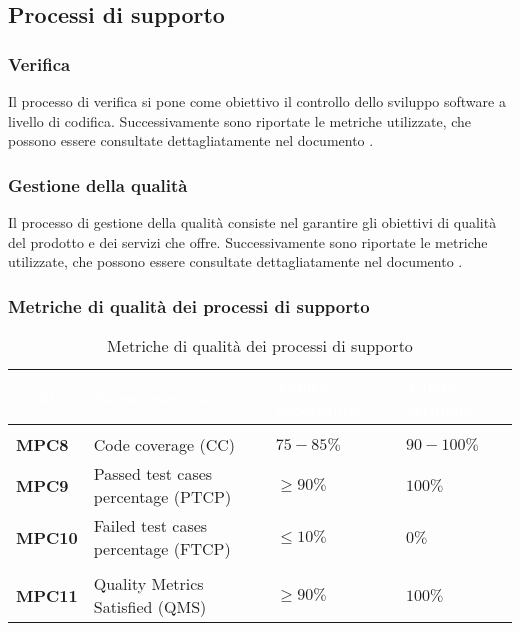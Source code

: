 \subsection{Processi di supporto}

\subsubsection{Verifica}
Il processo di verifica si pone come obiettivo il controllo dello sviluppo software a livello di codifica. Successivamente sono riportate le metriche utilizzate, che possono essere consultate dettagliatamente nel documento .

\subsubsection{Gestione della qualità}
Il processo di gestione della qualità consiste nel garantire gli obiettivi di qualità del prodotto e dei servizi che offre. Successivamente sono riportate le metriche utilizzate, che possono essere consultate dettagliatamente nel documento .

\subsubsection{Metriche di qualità dei processi di supporto}
{
\renewcommand{\arraystretch}{1.5}
\centering
\begin{longtable}{C{2.5cm} C{6cm} C{3cm} C{3cm}}
\textcolor{white}{\textbf{Codice}}&
\textcolor{white}{\textbf{Nome metrica}}&
\textcolor{white}{\textbf{Valore accettabile}}&
\textcolor{white}{\textbf{Valore ottimale}}\\
\hline
{}
 \\	
\endhead
\endfoot
{}\caption{Metriche di qualità dei processi di supporto}
\endlastfoot

\textbf{MPC8} & Code coverage (CC) & $ 75-85\% $  & $ 90-100 \% $ \\
\textbf{MPC9} & Passed test cases percentage (PTCP) & $ \geq 90\% $  & $ 100 \% $ \\
\textbf{MPC10} & Failed test cases percentage (FTCP) & $ \leq 10\% $  & $ 0 \% $ \\
 \\	
\textbf{MPC11} & Quality Metrics Satisfied (QMS) & $\geq 90\% $  & $ 100 \% $ \\

\end{longtable}
}

